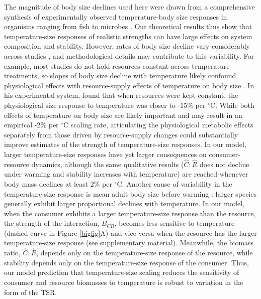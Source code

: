 \documentclass[11pt]{article}
\begin{document}
The magnitude of body size declines used here were drawn from a comprehensive synthesis of experimentally observed temperature-body size responses in organisms ranging from fish to microbes \citep{Forster2012}.  
Our theoretical results thus show that temperature-size responses of realistic strengths can have large effects on system composition and stability.
However, rates of body size decline vary considerably across studies \citep[e.g., ranging from 6 to -2$\%$ per $^\circ$C in unicellular organisms;][]{Forster2012}, and methodological details may contribute to this variability. 
For example, most studies do not hold resources constant across temperature treatments, so slopes of body size decline with temperature likely confound physiological effects with resource-supply effects of temperature on body size \citep{DeLong2012}. 
In his experimental system, \citet{DeLong2012} found that when resources were kept constant, the physiological size response to temperature was closer to -15$\%$ per $^\circ$C. 
While both effects of temperature on body size are likely important and may result in an empirical -2$\%$ per $^\circ$C scaling rate, articulating the physiological metabolic effects separately from those driven by resource-supply changes could substantially improve estimates of the strength of temperature-size responses. 
In our model, larger temperature-size responses have yet larger consequences on consumer-resource dynamics, although the same qualitative results ($\hat{C}:\hat{R}$ does not decline under warming and stability increases with temperature) are reached whenever body mass declines at least 2$\%$ per $^\circ$C.
Another cause of variability in the temperature-size response is mean adult body size before warming \citep{Forster2012,Horne2015}: larger species generally exhibit larger proportional declines with temperature. 
In our model, when the consumer exhibits a larger temperature-size response than the resource, the strength of the interaction, $B_{CR}$, becomes less sensitive to temperature (dashed curve in Figure \ref{bigfig}A) and vice-versa when the resource has the larger temperature-size response (see supplementary material). 
Meanwhile, the biomass ratio, $\hat{C}:\hat{R}$, depends only on the temperature-size response of the resource, while stability depends only on the temperature-size response of the consumer.
Thus, our model prediction that temperature-size scaling reduces the sensitivity of consumer and resource biomasses to temperature is robust to variation in the form of the TSR.
\end{document}
